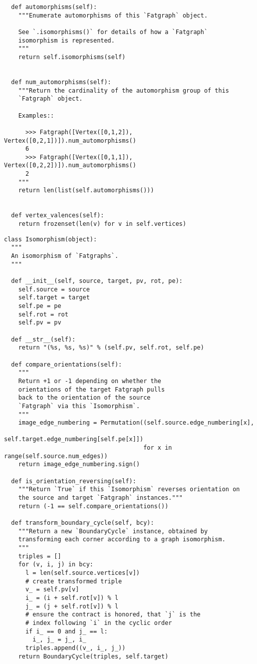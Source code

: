 \begin{lstlisting}
  def automorphisms(self):
    """Enumerate automorphisms of this `Fatgraph` object.

    See `.isomorphisms()` for details of how a `Fatgraph`
    isomorphism is represented.
    """
    return self.isomorphisms(self)


  def num_automorphisms(self):
    """Return the cardinality of the automorphism group of this
    `Fatgraph` object.

    Examples::

      >>> Fatgraph([Vertex([0,1,2]), Vertex([0,2,1])]).num_automorphisms()
      6
      >>> Fatgraph([Vertex([0,1,1]), Vertex([0,2,2])]).num_automorphisms()
      2
    """
    return len(list(self.automorphisms()))
  

  def vertex_valences(self):
    return frozenset(len(v) for v in self.vertices)

\end{lstlisting}


\begin{lstlisting}
class Isomorphism(object):
  """
  An isomorphism of `Fatgraphs`.
  """

  def __init__(self, source, target, pv, rot, pe):
    self.source = source
    self.target = target
    self.pe = pe
    self.rot = rot
    self.pv = pv

  def __str__(self):
    return "(%s, %s, %s)" % (self.pv, self.rot, self.pe)

  def compare_orientations(self):
    """
    Return +1 or -1 depending on whether the 
    orientations of the target Fatgraph pulls 
    back to the orientation of the source 
    `Fatgraph` via this `Isomorphism`.
    """
    image_edge_numbering = Permutation((self.source.edge_numbering[x],
                                        self.target.edge_numbering[self.pe[x]])
                                       for x in range(self.source.num_edges))
    return image_edge_numbering.sign()

  def is_orientation_reversing(self):
    """Return `True` if this `Isomorphism` reverses orientation on
    the source and target `Fatgraph` instances."""
    return (-1 == self.compare_orientations())

  def transform_boundary_cycle(self, bcy):
    """Return a new `BoundaryCycle` instance, obtained by
    transforming each corner according to a graph isomorphism.
    """
    triples = []
    for (v, i, j) in bcy:
      l = len(self.source.vertices[v])
      # create transformed triple 
      v_ = self.pv[v]
      i_ = (i + self.rot[v]) % l
      j_ = (j + self.rot[v]) % l
      # ensure the contract is honored, that `j` is the
      # index following `i` in the cyclic order
      if i_ == 0 and j_ == l:
        i_, j_ = j_, i_
      triples.append((v_, i_, j_))
    return BoundaryCycle(triples, self.target)
\end{lstlisting}

